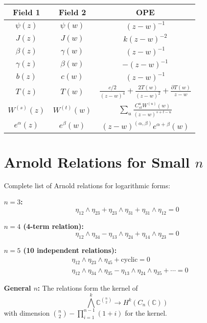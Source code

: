 \begin{center}
\begin{tabular}{|c|c|c|}
\hline
Field 1 & Field 2 & OPE \\
\hline
$\psi(z)$ & $\psi(w)$ & $(z-w)^{-1}$ \\
$J(z)$ & $J(w)$ & $k(z-w)^{-2}$ \\
$\beta(z)$ & $\gamma(w)$ & $(z-w)^{-1}$ \\
$\gamma(z)$ & $\beta(w)$ & $-(z-w)^{-1}$ \\
$b(z)$ & $c(w)$ & $(z-w)^{-1}$ \\
$T(z)$ & $T(w)$ & $\frac{c/2}{(z-w)^4} + \frac{2T(w)}{(z-w)^2} + \frac{\partial T(w)}{z-w}$ \\
$W^{(s)}(z)$ & $W^{(t)}(w)$ & $\sum_u \frac{C^u_{st} W^{(u)}(w)}{(z-w)^{s+t-u}}$ \\
$e^\alpha(z)$ & $e^\beta(w)$ & $(z-w)^{(\alpha,\beta)} e^{\alpha+\beta}(w)$ \\
\hline
\end{tabular}
\end{center}
 
\chapter{Arnold Relations for Small $n$}
 
Complete list of Arnold relations for logarithmic forms:
 
\textbf{$n = 3$:}
\[
\eta_{12} \wedge \eta_{23} + \eta_{23} \wedge \eta_{31} + \eta_{31} \wedge \eta_{12} = 0
\]
 
\textbf{$n = 4$ (4-term relation):}
\[
\eta_{12} \wedge \eta_{34} - \eta_{13} \wedge \eta_{24} + \eta_{14} \wedge \eta_{23} = 0
\]
 
\textbf{$n = 5$ (10 independent relations):}
\begin{align}
&\eta_{12} \wedge \eta_{23} \wedge \eta_{45} + \text{cyclic} = 0 \\
&\eta_{12} \wedge \eta_{34} \wedge \eta_{35} - \eta_{13} \wedge \eta_{24} \wedge \eta_{35} + \cdots = 0
\end{align}
 
\textbf{General $n$:} The relations form the kernel of
\[
\bigwedge^k \mathbb{C}^{\binom{n}{2}} \to H^k(C_n(\mathbb{C}))
\]
with dimension $\binom{n}{2} - \prod_{i=1}^{n-1}(1 + i)$ for the kernel.


